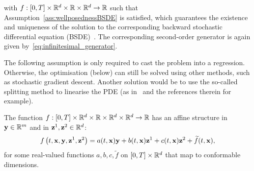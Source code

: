 with $f:[0,T]\times \mathbb{R}^d \times \mathbb{R} \times \mathbb{R}^{d} \rightarrow \mathbb{R}$ 
such that Assumption~\ref{ass:wellposednessBSDE} is satisfied, which guarantees the existence and uniqueness of the solution to the corresponding backward stochastic differential equation (BSDE)~\cite[Section 4]{Pardoux1990AdaptedEquation}.
The corresponding second-order generator is again given by~\eqref{eq:infinitesimal_generator}.

The following assumption is only required to cast the problem into a regression. 
Otherwise, the optimisation (below) can still be solved using other methods, such as stochastic gradient descent. Another solution would be to use the so-called splitting method to linearise the PDE (as in~\cite{Beck2021DeepPDEs} and the references therein for example).

\begin{assumption}\label{ass:faffine}
The function $f:[0,T]\times \mathbb{R}^d \times \mathbb{R} \times \mathbb{R}^{d}\times\mathbb{R}^{d} \rightarrow \mathbb{R}$ has an affine structure in $\mathbf{y} \in \mathbb{R}^m$ and in $\mathbf{z}^1,\mathbf{z}^2 \in \mathbb{R}^{d}$:
$$
f\left(t, \mathbf{x}, \mathbf{y}, \mathbf{z}^1, \mathbf{z}^2\right)
= a(t,\mathbf{x})\mathbf{y} + b(t, \mathbf{x})\mathbf{z}^1 + c(t, \mathbf{x}) \mathbf{z}^2 + \widetilde{f}(t, \mathbf{x}),
$$
for some real-valued functions $a,b,c,\widetilde{f}$ on $[0,T]\times\mathbb{R}^d$ that map to conformable dimensions. 
\end{assumption}

